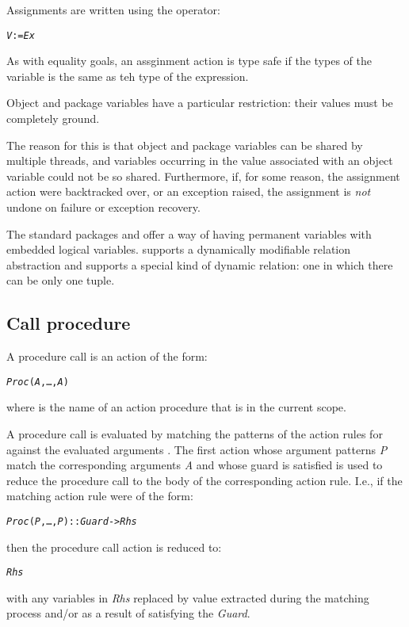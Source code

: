 Assignments are written using the \q{:=} operator:
\begin{alltt}
\emph{V} := \emph{Ex}
\end{alltt}
As with equality goals, an assginment action is type safe if the types of the variable is the same as teh type of the expression.

Object and package variables have a particular restriction: their values must be completely ground. 
\begin{aside}
The reason for this is that object and package variables can be shared by multiple threads, and variables occurring in the value associated with an object variable could not be so shared. Furthermore, if, for some reason, the assignment action were backtracked over, or an exception raised, the assignment is \emph{not} undone on failure or exception recovery.
\end{aside}

The standard packages  and  offer a way of having permanent variables with embedded logical variables.  supports a dynamically modifiable relation abstraction and  supports a special kind of dynamic relation: one in which there can be only one tuple.

\subsection{Call procedure}
\label{action:invoke}

A procedure call is an action of the form:
\begin{alltt}
\emph{Proc}(\emph{A},\ldots,\emph{A\subn})
\end{alltt}
where  is the name of an action procedure that is in the current scope.

A procedure call is evaluated by matching the patterns of the action rules for  against the evaluated arguments . The first action whose argument patterns \emph{P\subi} match the corresponding arguments \emph{A\subi} and whose guard is satisfied is used to reduce the procedure call to the body of the corresponding action rule. I.e., if the matching action rule were of the form:
\begin{alltt}
\emph{Proc}(\emph{P},\ldots,\emph{P\subn}) :: \emph{Guard} -> \emph{Rhs}
\end{alltt}
then the procedure call action is reduced to:
\begin{alltt}
\emph{Rhs}
\end{alltt}
with any variables in \emph{Rhs} replaced by value extracted during the matching process and/or as a result of satisfying the \emph{Guard}. 


